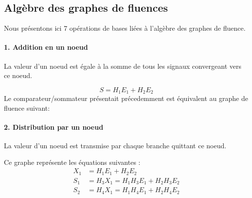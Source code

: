 \subsection{Algèbre des graphes de fluences}
Nous présentons ici 7 opérations de bases liées à l'algèbre des 
graphes de fluence.
\paragraph{1. Addition en un noeud}
La valeur d'un noeud est égale à la somme de tous les signaux convergeant 
vers ce noeud.
\begin{center}
    
\end{center}
\[
S=H_1E_1+H_2E_2
\]
Le comparateur/sommateur présentait précedemment est équivalent au graphe 
de fluence suivant:
\begin{center}
    
\end{center}
\paragraph{2. Distribution par un noeud}
La valeur d'un noeud est transmise par chaque branche quittant ce noeud.
\begin{center}
    
\end{center}
Ce graphe représente les équations suivantes :
\begin{align*}
    X_1&=H_1E_1+H_2E_2\\
    S_1&=H_3X_1=H_1H_3E_1+H_2H_3E_2\\
    S_2&=H_4X_1=H_1H_4E_1+H_2H_4E_2
\end{align*}
